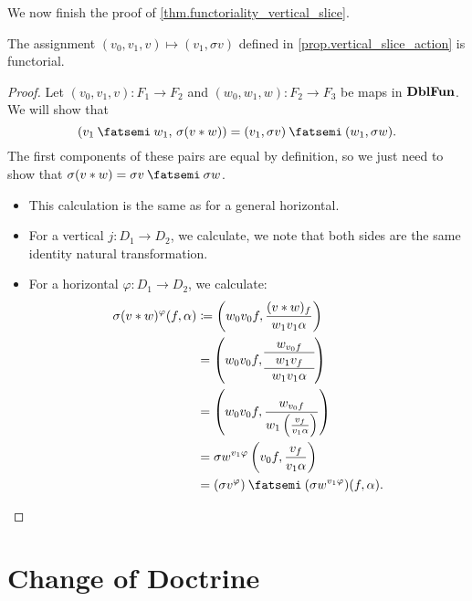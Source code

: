 \documentclass[DynamicalBook]{subfiles}
\begin{document}
We now finish the proof of \cref{thm.functoriality_vertical_slice}.
\begin{lemma}
The assignment $(v_0, v_1, v) \mapsto (v_1, \sigma v)$ defined in
\cref{prop.vertical_slice_action} is functorial.
\end{lemma}
\begin{proof}
Let $(v_0, v_1, v) : F_1 \to F_2$ and $(w_0, w_1, w) : F_2 \to F_3$ be maps in
$\textbf{DblFun}$. We will show that
$$(v_1 \then w_1,\, \sigma(v \ast w)) = (v_1, \sigma v) \then (w_1, \sigma w).$$
The first components of these pairs are equal by definition, so we just need to
show that $\sigma(v \ast w) = \sigma v \then \sigma w$.
\begin{itemize}
\item This calculation is the same as for a general horizontal. 
  \item For a vertical $j : D_1 \to D_2$, we calculate, we note that both sides
    are the same identity natural transformation.
  \item For a horizontal $\varphi : D_1 \to D_2$, we calculate:
  \begin{align*}
\sigma(v \ast w)^{\varphi}(f, \alpha) &\coloneqq \left( w_0v_0f, \frac{(v \ast w)_f}{w_1
    v_1 \alpha} \right)  \\ 
    &= \left( w_0 v_0 f, {\begin{tabular}{c} $w_{v_0 f}$\\ \hline $w_1 v_f$ \\ \hline $w_1 v_1 \alpha$ \end{tabular}} \right) \\
                              &= \left( w_0v_0 f, \frac{w_{v_0 f}}{w_1 \left( \frac{v_f}{v_1 \alpha} \right)} \right) \\
                              &= \sigma w^{v_1 \varphi} \left( v_0 f, \frac{v_f}{v_1 \alpha} \right) \\
    &= (\sigma v^{\varphi}) \then (\sigma w^{v_1 \varphi})(f, \alpha).
    \end{align*}
\end{itemize}
\end{proof}

\section{Change of Doctrine}
\end{document}
